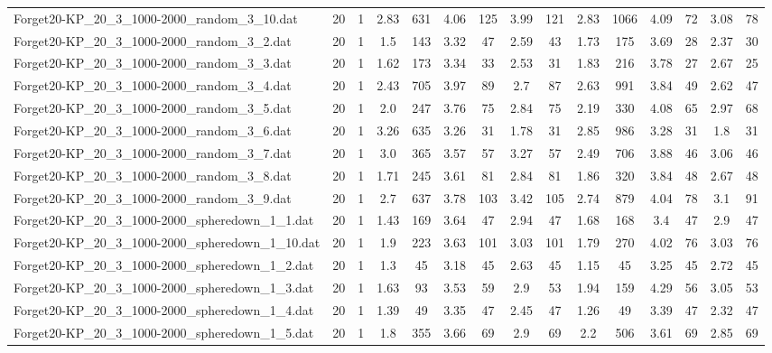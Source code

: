 \begin{table}[!ht]
{\begin{tabular}{lcccccccccccccc}
Forget20-KP\_20\_3\_1000-2000\_random\_3\_10.dat & 20 & 1 & 2.83 & 631 & 4.06 & 125 & 3.99 & 121 & 2.83 & 1066 & 4.09 & 72 & 3.08 & 78 \\
Forget20-KP\_20\_3\_1000-2000\_random\_3\_2.dat & 20 & 1 & 1.5 & 143 & 3.32 & 47 & 2.59 & 43 & 1.73 & 175 & 3.69 & 28 & 2.37 & 30 \\
Forget20-KP\_20\_3\_1000-2000\_random\_3\_3.dat & 20 & 1 & 1.62 & 173 & 3.34 & 33 & 2.53 & 31 & 1.83 & 216 & 3.78 & 27 & 2.67 & 25 \\
Forget20-KP\_20\_3\_1000-2000\_random\_3\_4.dat & 20 & 1 & 2.43 & 705 & 3.97 & 89 & 2.7 & 87 & 2.63 & 991 & 3.84 & 49 & 2.62 & 47 \\
Forget20-KP\_20\_3\_1000-2000\_random\_3\_5.dat & 20 & 1 & 2.0 & 247 & 3.76 & 75 & 2.84 & 75 & 2.19 & 330 & 4.08 & 65 & 2.97 & 68 \\
Forget20-KP\_20\_3\_1000-2000\_random\_3\_6.dat & 20 & 1 & 3.26 & 635 & 3.26 & 31 & 1.78 & 31 & 2.85 & 986 & 3.28 & 31 & 1.8 & 31 \\
Forget20-KP\_20\_3\_1000-2000\_random\_3\_7.dat & 20 & 1 & 3.0 & 365 & 3.57 & 57 & 3.27 & 57 & 2.49 & 706 & 3.88 & 46 & 3.06 & 46 \\
Forget20-KP\_20\_3\_1000-2000\_random\_3\_8.dat & 20 & 1 & 1.71 & 245 & 3.61 & 81 & 2.84 & 81 & 1.86 & 320 & 3.84 & 48 & 2.67 & 48 \\
Forget20-KP\_20\_3\_1000-2000\_random\_3\_9.dat & 20 & 1 & 2.7 & 637 & 3.78 & 103 & 3.42 & 105 & 2.74 & 879 & 4.04 & 78 & 3.1 & 91 \\
Forget20-KP\_20\_3\_1000-2000\_spheredown\_1\_1.dat & 20 & 1 & 1.43 & 169 & 3.64 & 47 & 2.94 & 47 & 1.68 & 168 & 3.4 & 47 & 2.9 & 47 \\
Forget20-KP\_20\_3\_1000-2000\_spheredown\_1\_10.dat & 20 & 1 & 1.9 & 223 & 3.63 & 101 & 3.03 & 101 & 1.79 & 270 & 4.02 & 76 & 3.03 & 76 \\
Forget20-KP\_20\_3\_1000-2000\_spheredown\_1\_2.dat & 20 & 1 & 1.3 & 45 & 3.18 & 45 & 2.63 & 45 & 1.15 & 45 & 3.25 & 45 & 2.72 & 45 \\
Forget20-KP\_20\_3\_1000-2000\_spheredown\_1\_3.dat & 20 & 1 & 1.63 & 93 & 3.53 & 59 & 2.9 & 53 & 1.94 & 159 & 4.29 & 56 & 3.05 & 53 \\
Forget20-KP\_20\_3\_1000-2000\_spheredown\_1\_4.dat & 20 & 1 & 1.39 & 49 & 3.35 & 47 & 2.45 & 47 & 1.26 & 49 & 3.39 & 47 & 2.32 & 47 \\
Forget20-KP\_20\_3\_1000-2000\_spheredown\_1\_5.dat & 20 & 1 & 1.8 & 355 & 3.66 & 69 & 2.9 & 69 & 2.2 & 506 & 3.61 & 69 & 2.85 & 69 \\

\end{tabular}}
\end{table}
